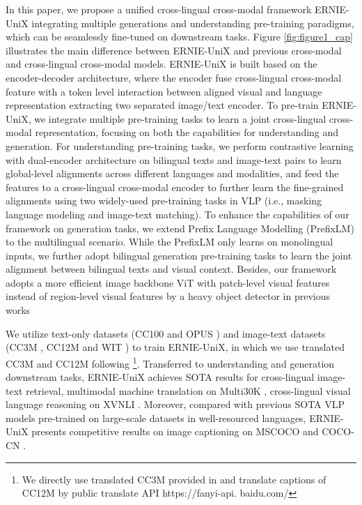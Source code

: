\documentclass{article}
\begin{document}
In this paper, we propose a unified cross-lingual cross-modal framework ERNIE-UniX integrating multiple generations and understanding pre-training paradigms,  which can be seamlessly fine-tuned on downstream tasks. Figure \ref{fig:figure1_cap} illustrates the main difference between ERNIE-UniX and previous cross-modal and cross-lingual cross-modal models.
ERNIE-UniX is built based on the encoder-decoder architecture, where the encoder fuse cross-lingual cross-modal feature with a token level interaction between aligned visual and language representation extracting two separated image/text encoder.
To pre-train ERNIE-UniX, we integrate multiple pre-training tasks to learn a joint cross-lingual cross-modal representation, focusing on both the capabilities for understanding and generation. 
For understanding pre-training tasks, we perform contrastive learning with dual-encoder architecture on bilingual texts and image-text pairs to learn global-level alignments across different languages and modalities, and feed the features to a cross-lingual cross-modal encoder to further learn the fine-grained alignments using two widely-used pre-training tasks in VLP (i.e., masking language modeling and image-text matching).
To enhance the capabilities of our framework on generation tasks, we extend Prefix Language Modelling (PrefixLM) \cite{simvlm2021} to the multilingual scenario. While the PrefixLM only learns on monolingual inputs, we further adopt bilingual generation pre-training tasks to learn the joint alignment between bilingual texts and visual context. 
Besides, our framework adopts a more efficient image backbone ViT \cite{vit2020} with patch-level visual features instead of region-level visual features by a heavy object detector in previous works \cite{m3p2020,UC22021} 


We utilize text-only datasets (CC100 \cite{xlmr2019} and OPUS \cite{opus-2012}) and image-text datasets (CC3M \cite{coco3m}, CC12M \cite{cc12m} and WIT \cite{wit2021}) to train ERNIE-UniX, in which we use translated CC3M and CC12M following \cite{UC22021}\footnote{We directly use translated CC3M provided in \cite{UC22021} and translate captions of CC12M by public translate API https://fanyi-api. baidu.com/}. Transferred to understanding and generation downstream tasks, ERNIE-UniX achieves SOTA results for cross-lingual image-text retrieval, multimodal machine translation on Multi30K \cite{elliott-EtAl:2017:WMT,barrault2018findings}, cross-lingual visual language reasoning on XVNLI \cite{xvnli-lingual}. Moreover, compared with previous SOTA VLP models pre-trained on large-scale datasets in well-resourced languages, ERNIE-UniX presents competitive results on image captioning on MSCOCO \cite{mscoco} and COCO-CN \cite{cococn}.
\end{document}
